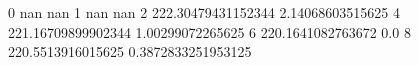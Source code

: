 0 nan nan
1 nan nan
2 222.30479431152344 2.14068603515625
4 221.16709899902344 1.00299072265625
6 220.1641082763672 0.0
8 220.5513916015625 0.3872833251953125
